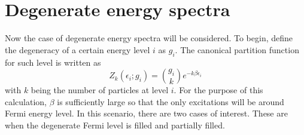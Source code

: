 \section{Degenerate energy spectra}
Now the case of degenerate energy spectra will be considered. To begin, define the degeneracy of a certain energy level $i$ as $g_i$. The canonical partition function for such level is written as
\begin{equation}
    Z_k(\epsilon_i;g_i)={g_i \choose k} e^{-k\beta\epsilon_i}
    \label{eq:ZNsinglelevel}
\end{equation}
with $k$ being the number of particles at level $i$.  For the purpose of this calculation, $\beta$ is sufficiently large so that the only excitations will be around Fermi energy level. In this scenario, there are two cases of interest. These are when the degenerate Fermi level is filled and partially filled. 

